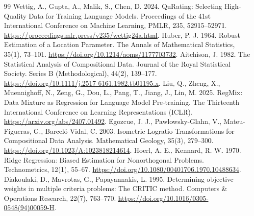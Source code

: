 \documentclass[bwprint]{gmcmthesis}
\begin{document}
\begin{thebibliography}{99}  %
  Wettig, A., Gupta, A., Malik, S., Chen, D. 2024. QuRating: Selecting High-Quality Data for Training Language Models. Proceedings of the 41st International Conference on Machine Learning, PMLR, 235, 52915--52971. \url{https://proceedings.mlr.press/v235/wettig24a.html}.  Huber, P. J. 1964. Robust Estimation of a Location Parameter. The Annals of Mathematical Statistics, 35(1), 73--101. \url{https://doi.org/10.1214/aoms/1177703732}.  Aitchison, J. 1982. The Statistical Analysis of Compositional Data. Journal of the Royal Statistical Society. Series B (Methodological), 44(2), 139--177. \url{https://doi.org/10.1111/j.2517-6161.1982.tb01195.x}.  Liu, Q., Zheng, X., Muennighoff, N., Zeng, G., Dou, L., Pang, T., Jiang, J., Lin, M. 2025. RegMix: Data Mixture as Regression for Language Model Pre-training. The Thirteenth International Conference on Learning Representations (ICLR). \url{https://arxiv.org/abs/2407.01492}.  Egozcue, J. J., Pawlowsky-Glahn, V., Mateu-Figueras, G., Barcel\'o-Vidal, C. 2003. Isometric Logratio Transformations for Compositional Data Analysis. Mathematical Geology, 35(3), 279--300. \url{https://doi.org/10.1023/A:1023818214614}.  Hoerl, A. E., Kennard, R. W. 1970. Ridge Regression: Biased Estimation for Nonorthogonal Problems. Technometrics, 12(1), 55--67. \url{https://doi.org/10.1080/00401706.1970.10488634}.  Diakoulaki, D., Mavrotas, G., Papayannakis, L. 1995. Determining objective weights in multiple criteria problems: The CRITIC method. Computers \& Operations Research, 22(7), 763--770. \url{https://doi.org/10.1016/0305-0548(94)00059-H}.
 

\end{thebibliography}
\end{document}
